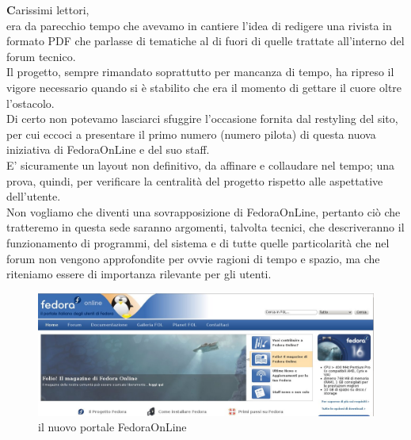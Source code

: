 \onehalfspacing
\lettrine[lines=1, loversize=0.1, lraise=0.1]{\color[cmyk]{0.5, 0, 1, 0}\bfseries C}{}arissimi lettori,\\ 
era da parecchio tempo che avevamo in cantiere l'idea di redigere una rivista in formato PDF che parlasse di tematiche al di fuori di quelle trattate all'interno del forum tecnico.\\

Il progetto, sempre rimandato soprattutto per mancanza di tempo, ha ripreso il vigore necessario quando si è stabilito che era il momento di gettare il cuore oltre l'ostacolo.\\

Di certo non potevamo lasciarci sfuggire l'occasione fornita dal restyling del sito, per cui eccoci a presentare il primo numero (numero pilota) di questa nuova iniziativa di FedoraOnLine e del suo staff.\\

E' sicuramente un layout non definitivo, da affinare e collaudare nel tempo; una prova, quindi, per verificare la centralità del progetto rispetto alle aspettative dell'utente.\\

Non vogliamo che diventi una sovrapposizione di FedoraOnLine, pertanto ciò che tratteremo in questa sede saranno argomenti, talvolta tecnici, che descriveranno il funzionamento di programmi, del sistema e di tutte quelle particolarità che nel forum non vengono approfondite per ovvie ragioni di tempo e spazio, ma che riteniamo essere di importanza rilevante per gli utenti.\\

\begin{figure}[htbp]
\centering
\includegraphics[scale=.20]{articoli/editoriale/immagini/fol.jpeg}
\caption{il nuovo portale FedoraOnLine\label{fig 1:Il nuovo portale FedoraOnLine}}
\end{figure}

